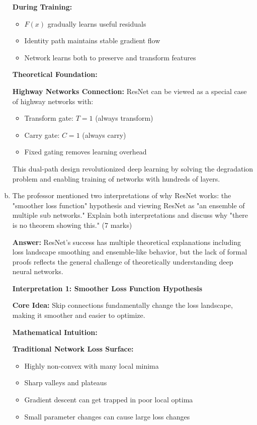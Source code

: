 \documentclass[12pt]{article}
\newcommand{\answer}[1]{{\color{answercolor}\textbf{Answer:} #1}}
\newcommand{\explanation}[1]{{\color{explanationcolor}#1}}
\begin{document}
\begin{enumerate}[(a)]
{    \textbf{During Training:}
    \begin{itemize}
        \item $F(x)$ gradually learns useful residuals
        \item Identity path maintains stable gradient flow
        \item Network learns both to preserve and transform features
    \end{itemize}
    
    \textbf{Theoretical Foundation:}
    
    \textbf{Highway Networks Connection:}
    ResNet can be viewed as a special case of highway networks with:
    \begin{itemize}
        \item Transform gate: $T = 1$ (always transform)
        \item Carry gate: $C = 1$ (always carry)
        \item Fixed gating removes learning overhead
    \end{itemize}
    
    This dual-path design revolutionized deep learning by solving the degradation problem and enabling training of networks with hundreds of layers.
    }
    
    \item The professor mentioned two interpretations of why ResNet works: the "smoother loss function" hypothesis and viewing ResNet as "an ensemble of multiple sub networks." Explain both interpretations and discuss why "there is no theorem showing this." \hfill (7 marks)
    
    \answer{ResNet's success has multiple theoretical explanations including loss landscape smoothing and ensemble-like behavior, but the lack of formal proofs reflects the general challenge of theoretically understanding deep neural networks.}
    
    \explanation{
    \textbf{Interpretation 1: Smoother Loss Function Hypothesis}
    
    \textbf{Core Idea:}
    Skip connections fundamentally change the loss landscape, making it smoother and easier to optimize.
    
    \textbf{Mathematical Intuition:}
    
    \textbf{Traditional Network Loss Surface:}
    \begin{itemize}
        \item Highly non-convex with many local minima
        \item Sharp valleys and plateaus
        \item Gradient descent can get trapped in poor local optima
        \item Small parameter changes can cause large loss changes
    \end{itemize}
    
}
\end{enumerate}
\end{document}
